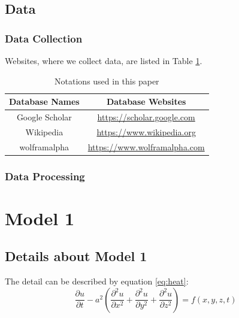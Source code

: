 \documentclass[12pt]{ctexart}
\begin{document}


\subsection{Data}
\subsubsection{Data Collection}
Websites, where we collect data, are listed in Table \ref{tb:data}.

\begin{table}[htbp]%
	\begin{center}
		\caption{Notations used in this paper}
		\begin{tabular}{c c}
			\toprule[1.5pt]
			\multicolumn{1}{m{5cm}}{\centering \textbf{Database Names}}
			               & \multicolumn{1}{m{10cm}}{\centering \textbf{Database Websites}}   \\
			\midrule
			Google Scholar & \href{https://scholar.google.com} {https://scholar.google.com}    \\
			Wikipedia      & \href{https://www.wikipedia.org}{https://www.wikipedia.org}       \\
			wolframalpha   & \href{https://www.wolframalpha.com}{https://www.wolframalpha.com} \\
			\bottomrule[1.5pt]
		\end{tabular}\label{tb:data}
	\end{center}
\end{table}
\vspace{-1cm}%
\subsubsection{Data Processing}
\section{Model 1}
\subsection{Details about Model 1}
The detail can be described by equation \eqref{eq:heat}:
\begin{equation}\label{eq:heat}
	\frac{\partial u}{\partial t} - a^2 \left( \frac{\partial^2 u}{\partial x^2} + \frac{\partial^2 u}{\partial y^2} + \frac{\partial^2 u}{\partial z^2} \right) = f(x, y, z, t)
\end{equation}
\end{document}

